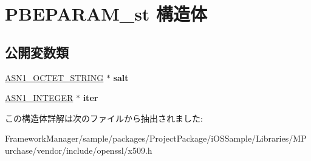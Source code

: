 \hypertarget{struct_p_b_e_p_a_r_a_m__st}{}\section{P\+B\+E\+P\+A\+R\+A\+M\+\_\+st 構造体}
\label{struct_p_b_e_p_a_r_a_m__st}
\subsection*{公開変数類}
\begin{DoxyCompactItemize}
\item 
\hypertarget{struct_p_b_e_p_a_r_a_m__st_ab7fbc3e560ddba64320f0fe268d6caec}{}\hyperlink{structasn1__string__st}{A\+S\+N1\+\_\+\+O\+C\+T\+E\+T\+\_\+\+S\+T\+R\+I\+N\+G} $\ast$ {\bfseries salt}\label{struct_p_b_e_p_a_r_a_m__st_ab7fbc3e560ddba64320f0fe268d6caec}

\item 
\hypertarget{struct_p_b_e_p_a_r_a_m__st_a4f47729d79e3dd79bf1ccef09157cd1d}{}\hyperlink{structasn1__string__st}{A\+S\+N1\+\_\+\+I\+N\+T\+E\+G\+E\+R} $\ast$ {\bfseries iter}\label{struct_p_b_e_p_a_r_a_m__st_a4f47729d79e3dd79bf1ccef09157cd1d}

\end{DoxyCompactItemize}


この構造体詳解は次のファイルから抽出されました\+:\begin{DoxyCompactItemize}
\item 
Framework\+Manager/sample/packages/\+Project\+Package/i\+O\+S\+Sample/\+Libraries/\+M\+Purchase/vendor/include/openssl/x509.\+h\end{DoxyCompactItemize}
